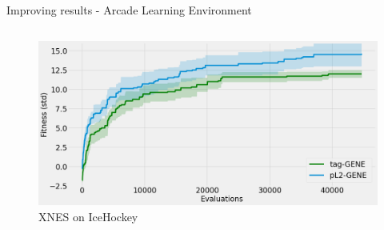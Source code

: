 \begin{frame}{\tciii{} Improving results - Arcade Learning Environment}
{\begin{columns}
      \begin{column}{0.45\linewidth}
        \begin{center}
          \begin{figure}
              \centering
   \includegraphics[width=.9\linewidth]{images/GENE/plots/IceHockey - 128-64-64-18 - xnes.png}
        \caption{XNES on IceHockey}
          \end{figure}
        \end{center}
      \end{column}
    \end{columns}
    }
\end{frame}
